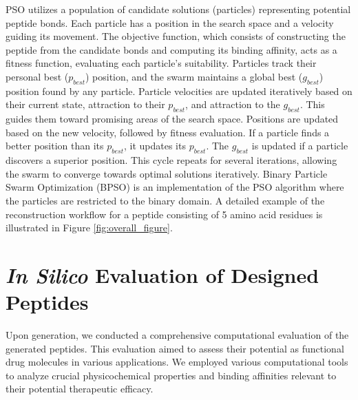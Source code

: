 PSO utilizes a population of candidate solutions (particles) representing potential peptide bonds. Each particle has a position in the search space and a velocity guiding its movement. The objective function, which consists of constructing the peptide from the candidate bonds and computing its binding affinity, acts as a fitness function, evaluating each particle's suitability. Particles track their personal best ($p_{best}$) position, and the swarm maintains a global best ($g_{best}$) position found by any particle. Particle velocities are updated iteratively based on their current state, attraction to their $p_{best}$, and attraction to the $g_{best}$. This guides them toward promising areas of the search space. Positions are updated based on the new velocity, followed by fitness evaluation. If a particle finds a better position than its $p_{best}$, it updates its $p_{best}$. The $g_{best}$ is updated if a particle discovers a superior position. This cycle repeats for several iterations, allowing the swarm to converge towards optimal solutions iteratively. Binary Particle Swarm Optimization (BPSO) is an implementation of the PSO algorithm where the particles are restricted to the binary domain. A detailed example of the reconstruction workflow for a peptide consisting of 5 amino acid residues is illustrated in Figure \ref{fig:overall_figure}.

\section{\textit{In Silico} Evaluation of Designed Peptides}
Upon generation, we conducted a comprehensive computational evaluation of the generated peptides. This evaluation aimed to assess their potential as functional drug molecules in various applications. We employed various computational tools to analyze crucial physicochemical properties and binding affinities relevant to their potential therapeutic efficacy.

